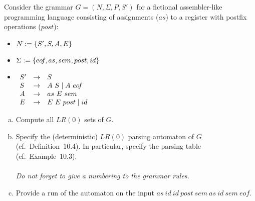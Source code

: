 \begin{exercise}{20}
Consider the grammar $G = (N, \Sigma, P, S')$ for a fictional assembler-like programming language consisting of assignments ($as$) to a register with postfix operations ($post$):

\newcommand{\eof}{eo\!f}

\begin{itemize}
       \item $N := \left\{ S', S, A, E \right\}$
       \item $\Sigma := \set{ \eof, as, sem, post, id}$
       \item
        $\begin{array}[t]{lcl}
        S' &\to& S\\
        S &\to& A\ S \mid A\ \eof\\
        A &\to& as\ E\ sem\\
        E &\to& E\ E\ post \mid id\\
       \end{array}$
\end{itemize}

\begin{enumerate}[(a)]
    \item Compute all $LR(0)$ sets of $G$.

    \item Specify the (deterministic) $LR(0)$ parsing automaton of $G$ (cf.\ Definition~10.4).
    In particular, specify the parsing table (cf.\ Example~10.3). \\ \\
    \noindent
    \emph{
    Do not forget to give a numbering to the grammar rules.}

    \item Provide a run of the automaton on the input $as\ id\ id\ post\ sem\ as\ id\ sem\ \eof$.
\end{enumerate}
\end{exercise}

